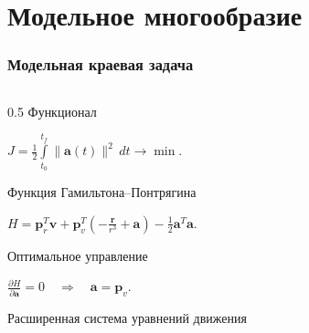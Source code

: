 \section{Модельное многообразие}
\begin{frame}[t]
    \frametitle{Модельная краевая задача}
    \begin{columns}[T,onlytextwidth]
        \begin{column}{0.5\textwidth}
            \presentationtextsize
            \vspace{-0.18cm}
            Функционал
            \vspace{-0.18cm}
            \begin{flushleft}
            \(\displaystyle J=\frac{1}{2}\int\limits_{t_0}^{t_f}\|\mathbf a(t)\|^2\,dt \to \min.\)
            \end{flushleft}
            \vspace{-0.18cm}
            Функция Гамильтона--Понтрягина
            \vspace{-0.18cm}
            \begin{flushleft}
            \(\displaystyle H=\mathbf p_r^{T}\mathbf v+
            \mathbf p_v^{T}\left(-\frac{\mathbf r}{r^3}+\mathbf a\right)
            -\frac{1}{2}\mathbf a^{T}\mathbf a.\)
            \end{flushleft}
            \vspace{-0.18cm}
            Оптимальное управление
            \vspace{-0.18cm}
            \begin{flushleft}
            \(\displaystyle \frac{\partial H}{\partial \mathbf a}=0
            \quad\Rightarrow\quad
            \mathbf a=\mathbf p_v.\)
            \end{flushleft}
            \vspace{-0.18cm}
            Расширенная система уравнений движения
            \vspace{-0.18cm}
\end{column}
\end{columns}
\end{frame}

